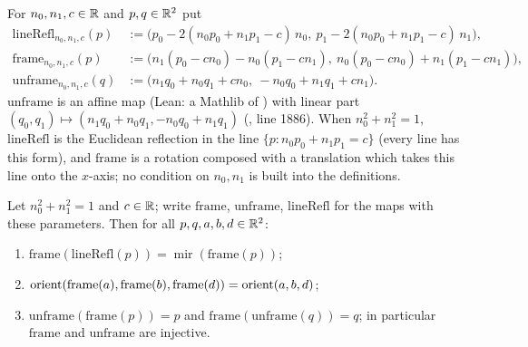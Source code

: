 \begin{definition}\label{mb:def:frame}
For $n_0,n_1,c\in\mathbb R$ and $p,q\in\mathbb R^2$ put
\begin{align*}
\mathrm{lineRefl}_{n_0,n_1,c}(p)&:=\bigl(p_0-2(n_0p_0+n_1p_1-c)\,n_0,\ p_1-2(n_0p_0+n_1p_1-c)\,n_1\bigr),\\
\mathrm{frame}_{n_0,n_1,c}(p)&:=\bigl(n_1(p_0-cn_0)-n_0(p_1-cn_1),\ n_0(p_0-cn_0)+n_1(p_1-cn_1)\bigr),\\
\mathrm{unframe}_{n_0,n_1,c}(q)&:=\bigl(n_1q_0+n_0q_1+cn_0,\ -n_0q_0+n_1q_1+cn_1\bigr).
\end{align*}
$\mathrm{unframe}$ is an affine map (Lean: a Mathlib  of ) with linear part
$(q_0,q_1)\mapsto(n_1q_0+n_0q_1,-n_0q_0+n_1q_1)$ (, line 1886). When $n_0^2+n_1^2=1$,
$\mathrm{lineRefl}$ is the Euclidean reflection in the line $\{p:n_0p_0+n_1p_1=c\}$ (every line has this form), and
$\mathrm{frame}$ is a rotation composed with a translation which takes this line onto the $x$-axis; no condition on
$n_0,n_1$ is built into the definitions.
\end{definition}

\begin{lemma}\label{mb:lem:frame}
Let $n_0^2+n_1^2=1$ and $c\in\mathbb R$; write $\mathrm{frame}$, $\mathrm{unframe}$, $\mathrm{lineRefl}$ for the maps with these
parameters. Then for all $p,q,a,b,d\in\mathbb R^2$:
\begin{enumerate}[label=(\alph*)]
\item $\mathrm{frame}(\mathrm{lineRefl}(p))=\operatorname{mir}(\mathrm{frame}(p))$;
\item $\operatorname{orient}(\mathrm{frame}(a),\mathrm{frame}(b),\mathrm{frame}(d))=\operatorname{orient}(a,b,d)$;
\item $\mathrm{unframe}(\mathrm{frame}(p))=p$ and $\mathrm{frame}(\mathrm{unframe}(q))=q$; in particular $\mathrm{frame}$
  and $\mathrm{unframe}$ are injective.
\end{enumerate}
\end{lemma}

